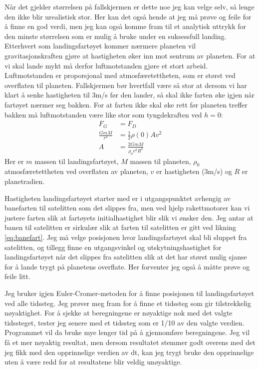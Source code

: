 \documentclass[reprint,english,notitlepage]{revtex4-1}  %
\begin{document}
Når det gjelder størrelsen på fallskjermen er dette noe jeg kan velge selv, så lenge den ikke blir urealistisk stor. Her kan det også hende at jeg må prøve og feile for å finne en god verdi, men jeg kan også komme fram til et analytisk uttrykk for den minste størrelsen som er mulig å bruke under en suksessfull landing. Etterhvert som landingsfartøyet kommer nærmere planeten vil gravitasjonskraften gjøre at hastigheten øker inn mot sentrum av planeten. For at vi skal lande mykt må derfor luftmotstanden gjøre et stort arbeid. Luftmotstanden er proporsjonal med atmosfæretettheten, som er størst ved overflaten til planeten. Fallskjermen bør hvertfall være så stor at dersom vi har klart å senke hastigheten til 3m/s før den lander, så skal ikke farten øke igjen når fartøyet nærmer seg bakken. For at farten ikke skal øke rett før planeten treffer bakken må luftmotstanden være like stor som tyngdekraften ved $h = 0$:
 \begin{align*}
   F_G &= F_D \\
   \frac{G m M}{r^2} &= \frac{1}{2} \rho(0) A v^2 \\
   A &= \frac{2 G m M}{\rho_0 v^2 R^2}
 \end{align*}
 Her er $m$ massen til landingsfartøyet, $M$ massen til planeten, $\rho_0$ atmosfæretettheten ved overflaten av planeten, $v$ er hastigheten (3m/s) og $R$ er planetradien.

Hastigheten landingsfartøyet starter med er i utgangspunktet avhengig av banefarten til satelitten som det slippes fra, men ved hjelp rakettmotorer kan vi justere farten slik at fartøyets initialhastighet blir slik vi ønsker den. Jeg antar at banen til satelitten er sirkulær slik at farten til satelitten er gitt ved likning \ref{eq:banefart}. Jeg må velge posisjonen hvor landingsfartøyet skal bli sluppet fra satelitten, og tillegg finne en utgangsvinkel og utskytningshastighet for landingsfartøyet når det slippes fra satelitten slik at det har størst mulig sjanse for å lande trygt på planetens overflate. Her forventer jeg også å måtte prøve og feile litt.

Jeg bruker igjen Euler-Cromer-metoden for å finne posisjonen til landingsfartøyet ved alle
 tidssteg. Jeg prøver meg fram for å finne et tidssteg som gir tilstrekkelig nøyaktighet. For å sjekke at beregningene er nøyaktige nok med det valgte tidssteget, tester jeg senere med et tidssteg som er 1/10 av den valgte verdien. Programmet vil da bruke mye lenger tid på å gjennomføre beregningene. Jeg vil få et mer nøyaktig resultat, men dersom resultatet stemmer godt overens med det jeg fikk med den opprinnelige verdien av dt, kan jeg trygt bruke den opprinnelige uten å være redd for at resultatene blir veldig unøyaktige.
\end{document}
